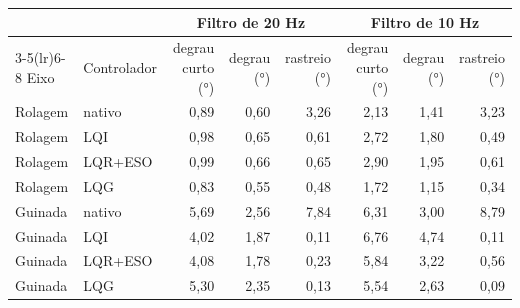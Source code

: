 \begin{tabular}{llrrrrrr}
\toprule
 & & \multicolumn{3}{c}{Filtro de 20 Hz} & \multicolumn{3}{c}{Filtro de 10 Hz} \\
\cmidrule(lr){3-5}\cmidrule(lr){6-8}
Eixo & Controlador & degrau curto (\si{\degree}) & degrau (\si{\degree}) & rastreio (\si{\degree}) & degrau curto (\si{\degree}) & degrau (\si{\degree}) & rastreio (\si{\degree}) \\
\midrule
Rolagem & nativo & 0,89 & 0,60 & 3,26 & 2,13 & 1,41 & 3,23 \\
Rolagem & LQI & 0,98 & 0,65 & 0,61 & 2,72 & 1,80 & 0,49 \\
Rolagem & LQR+ESO & 0,99 & 0,66 & 0,65 & 2,90 & 1,95 & 0,61 \\
Rolagem & LQG & 0,83 & 0,55 & 0,48 & 1,72 & 1,15 & 0,34 \\
\addlinespace
Guinada & nativo & 5,69 & 2,56 & 7,84 & 6,31 & 3,00 & 8,79 \\
Guinada & LQI & 4,02 & 1,87 & 0,11 & 6,76 & 4,74 & 0,11 \\
Guinada & LQR+ESO & 4,08 & 1,78 & 0,23 & 5,84 & 3,22 & 0,56 \\
Guinada & LQG & 5,30 & 2,35 & 0,13 & 5,54 & 2,63 & 0,09 \\
\bottomrule
\end{tabular}
